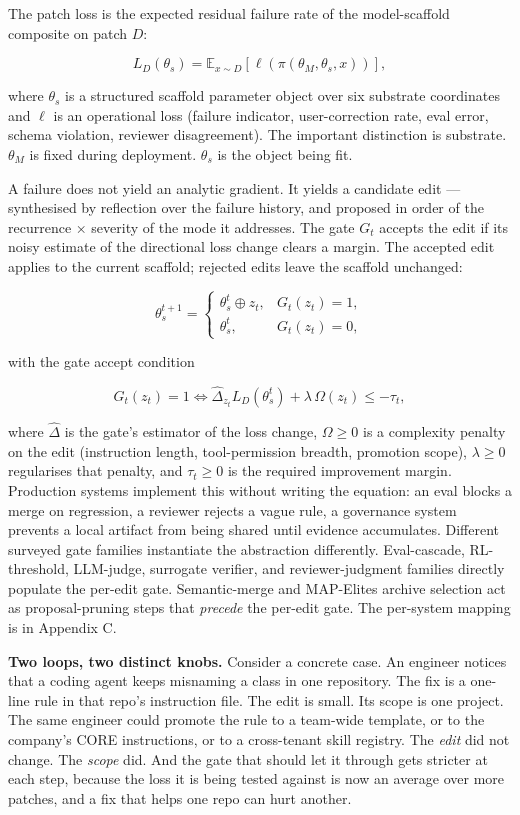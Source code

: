 The patch loss is the expected residual failure rate of the
model-scaffold composite on patch \(D\):

\[L_D(\theta_s) = \mathbb{E}_{x \sim D}\!\left[\ell(\pi(\theta_M, \theta_s, x))\right],\]

where \(\theta_s\) is a structured scaffold parameter object over six
substrate coordinates and \(\ell\) is an operational loss (failure
indicator, user-correction rate, eval error, schema violation, reviewer
disagreement). The important distinction is substrate. \(\theta_M\) is
fixed during deployment. \(\theta_s\) is the object being fit.

A failure does not yield an analytic gradient. It yields a candidate
edit --- synthesised by reflection over the failure history, and
proposed in order of the recurrence × severity of the mode it addresses.
The gate \(G_t\) accepts the edit if its noisy estimate of the
directional loss change clears a margin. The accepted edit applies to
the current scaffold; rejected edits leave the scaffold unchanged:

\[\theta_s^{t+1} = \begin{cases} \theta_s^t \oplus z_t, & G_t(z_t)=1, \\ \theta_s^t, & G_t(z_t)=0, \end{cases}\]

with the gate accept condition

\[G_t(z_t)=1 \iff \widehat{\Delta}_{z_t} L_D(\theta_s^t) + \lambda\,\Omega(z_t) \leq -\tau_t,\]

where \(\widehat{\Delta}\) is the gate's estimator of the loss change,
\(\Omega \geq 0\) is a complexity penalty on the edit (instruction
length, tool-permission breadth, promotion scope), \(\lambda \geq 0\)
regularises that penalty, and \(\tau_t \geq 0\) is the required
improvement margin. Production systems implement this without writing
the equation: an eval blocks a merge on regression, a reviewer rejects a
vague rule, a governance system prevents a local artifact from being
shared until evidence accumulates. Different surveyed gate families
instantiate the abstraction differently. Eval-cascade, RL-threshold,
LLM-judge, surrogate verifier, and reviewer-judgment families directly
populate the per-edit gate. Semantic-merge and MAP-Elites archive
selection act as proposal-pruning steps that \emph{precede} the per-edit
gate. The per-system mapping is in Appendix C.

\textbf{Two loops, two distinct knobs.} Consider a concrete case. An
engineer notices that a coding agent keeps misnaming a class in one
repository. The fix is a one-line rule in that repo's instruction file.
The edit is small. Its scope is one project. The same engineer could
promote the rule to a team-wide template, or to the company's CORE
instructions, or to a cross-tenant skill registry. The \emph{edit} did
not change. The \emph{scope} did. And the gate that should let it
through gets stricter at each step, because the loss it is being tested
against is now an average over more patches, and a fix that helps one
repo can hurt another.

